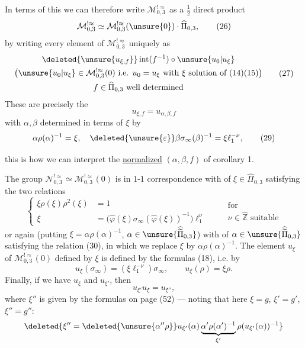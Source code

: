 In terms of this we can therefore write $\mathcal M_{0,3}^{!\approx}$ as a $\frac12$ direct product
\[
\mathcal M_{0,3}^{!\approx}\simeq\mathcal M_{0,3}^{!\approx}(\unsure{0})\cdot\widehat\Pi_{0,3},
\tag{26}
\]
by writing every element of $\mathcal M_{0,3}^{!\approx}$ uniquely as
\[
\begin{gathered}
\deleted{\unsure{u_{\xi,f}}}\operatorname{int}(f^{-1})\circ\unsure{u_0|u_\xi}\\
\bigl(\unsure{u_0|u_\xi}\in\mathcal M_{0,3}^{!\approx}(0)\text{ i.e. }u_0=u_\xi\text{ with }\xi\text{ solution of }(14)(15)\bigr)\\
f\in\widehat\Pi_{0,3}\text{ well determined}
\end{gathered}
\tag{27}
\]
These are precisely the  
\[
u_{\xi,f}=u_{\alpha,\beta,f}
\tag{28}
\]
with $\alpha,\beta$ determined in terms of $\xi$ by
\[
\alpha\rho(\alpha)^{-1}=\xi,\quad\deleted{\unsure{\varepsilon}}\beta\sigma_\infty(\beta)^{-1}=\xi \ell_1^{-\nu},
\tag{29}
\]


this is how we can interpret the \uline{normalized}  $(\alpha,\beta,f)$ of corollary 1.

\uline{}  The group $\mathcal N_{0,3}^{!\approx}\simeq\mathcal M_{0,3}^{!\approx}(0)$ is in $1$-$1$ correspondence with  of $\xi\in\widehat\Pi_{0,3}$ satisfying the two relations
\[
\left\{
\begin{aligned}
\xi\rho(\xi)\rho^2(\xi)&=1\\
\xi&=\bigl(\widehat\varphi(\xi)\sigma_\infty(\widehat\varphi(\xi))^{-1}\bigr)\ell_1^\nu
\end{aligned}
\right.
\qquad\begin{gathered}\text{for}\\\nu\in\widehat{\mathbb Z}\text{ suitable}\end{gathered}
\tag{30}
\]
or again (putting $\xi=\alpha\rho(\alpha)^{-1}$, $\alpha\in\unsure{\widehat{\widetilde\Pi}_{0,3}}$) with  of $\alpha\in\unsure{\widehat{\widetilde\Pi}_{0,3}}$ satisfying the  relation (30), in which we replace $\xi$ by $\alpha\rho(\alpha)^{-1}$. The element $u_\xi$ of $\mathcal M_{0,3}^{!\approx}(0)$ defined by $\xi$ is defined by the formulas (18), i.e. by
\[
u_\xi(\sigma_\infty)=(\xi \ell_1^{-\nu})\sigma_\infty,
\qquad u_\xi(\rho)=\xi\rho.
\tag{31}
\]
Finally, if we have $u_\xi$ and $u_{\xi'}$, then
\[
u_{\xi'}u_\xi=u_{\xi''},
\tag{32}
\]
where $\xi''$ is given by the formulas on page  (52) --- noting that here $\xi=g$, $\xi'=g'$, $\xi''=g''$:
\[
\deleted{\xi''=\deleted{\unsure{\alpha''\rho}}u_{\xi'}(\alpha)\underbrace{\alpha'\rho(\alpha')^{-1}}_{\xi'}\rho(u_{\xi'}(\alpha))^{-1}}
\]


